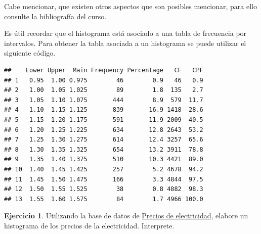 \documentclass[
  11pt,
]{book}
\newenvironment{Shaded}{\begin{snugshade}}{\end{snugshade}}
\newcommand{\AttributeTok}[1]{\textcolor[rgb]{0.13,0.29,0.53}{#1}}
\newcommand{\CommentTok}[1]{\textcolor[rgb]{0.56,0.35,0.01}{\textit{#1}}}
\newcommand{\DecValTok}[1]{\textcolor[rgb]{0.00,0.00,0.81}{#1}}
\newcommand{\FunctionTok}[1]{\textcolor[rgb]{0.13,0.29,0.53}{\textbf{#1}}}
\newcommand{\NormalTok}[1]{#1}
\newcommand{\OtherTok}[1]{\textcolor[rgb]{0.56,0.35,0.01}{#1}}
\newcommand{\SpecialCharTok}[1]{\textcolor[rgb]{0.81,0.36,0.00}{\textbf{#1}}}
\theoremstyle{definition}
\theoremstyle{definition}
\theoremstyle{definition}
\newtheorem{exercise}{Ejercicio}[chapter]
\theoremstyle{definition}
\theoremstyle{remark}
\begin{document}
Cabe mencionar, que existen otros aspectos que son posibles mencionar, para ello consulte la bibliografía del curso.

Es útil recordar que el histograma está asociado a una tabla de frecuencia por intervalos. Para obtener la tabla asociada a un histograma se puede utilizar el siguiente código.

\begin{Shaded}
\end{Shaded}

\begin{verbatim}
##    Lower Upper  Main Frequency Percentage   CF   CPF
## 1   0.95  1.00 0.975        46        0.9   46   0.9
## 2   1.00  1.05 1.025        89        1.8  135   2.7
## 3   1.05  1.10 1.075       444        8.9  579  11.7
## 4   1.10  1.15 1.125       839       16.9 1418  28.6
## 5   1.15  1.20 1.175       591       11.9 2009  40.5
## 6   1.20  1.25 1.225       634       12.8 2643  53.2
## 7   1.25  1.30 1.275       614       12.4 3257  65.6
## 8   1.30  1.35 1.325       654       13.2 3911  78.8
## 9   1.35  1.40 1.375       510       10.3 4421  89.0
## 10  1.40  1.45 1.425       257        5.2 4678  94.2
## 11  1.45  1.50 1.475       166        3.3 4844  97.5
## 12  1.50  1.55 1.525        38        0.8 4882  98.3
## 13  1.55  1.60 1.575        84        1.7 4966 100.0
\end{verbatim}

\begin{exercise}
Utilizando la base de datos de \hyperref[PreciosElectricidad]{Precios de electricidad}, elabore un histograma de los precios de la electricidad. Interprete.
\end{exercise}
\end{document}
